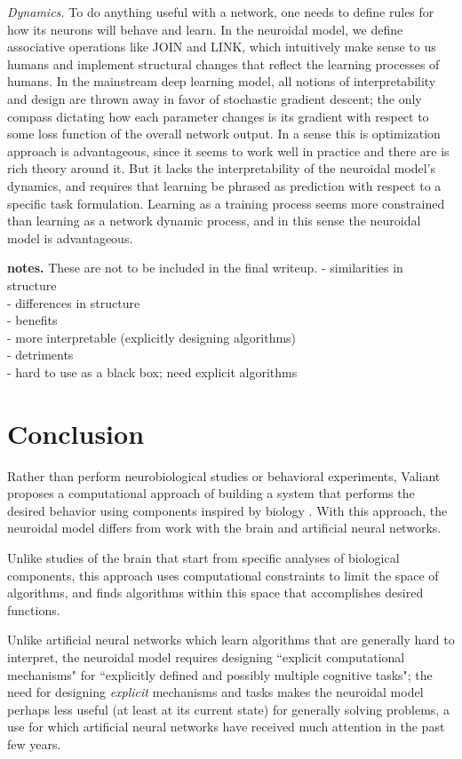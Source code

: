 \documentclass[letterpaper, 12pt]{article}
\begin{document}
{\it Dynamics.} To do anything useful with a network, one needs to define rules for how its neurons will behave and learn. In the neuroidal model, we define associative operations like JOIN and LINK, which intuitively make sense to us humans and implement structural changes that reflect the learning processes of humans. In the mainstream deep learning model, all notions of interpretability and design are thrown away in favor of stochastic gradient descent; the only compass dictating how each parameter changes is its gradient with respect to some loss function of the overall network output. In a sense this is optimization approach is advantageous, since it seems to work well in practice and there are is rich theory around it. But it lacks the interpretability of the neuroidal model's dynamics, and requires that learning be phrased as prediction with respect to a specific task formulation. Learning as a training process seems more constrained than learning as a network dynamic process, and in this sense the neuroidal model is advantageous. 

{\bf notes.} These are not to be included in the final writeup.
- similarities in structure\\
- differences in structure\\
- benefits\\
- more interpretable (explicitly designing algorithms)\\
- detriments\\
- hard to use as a black box; need explicit algorithms\\

\section{Conclusion}
Rather than perform neurobiological studies or behavioral experiments, Valiant proposes a computational approach of building a system that performs the desired behavior using components inspired by biology \cite{valiant_circuits_1994}. With this approach, the neuroidal model differs from work with the brain and artificial neural networks.

Unlike studies of the brain that start from specific analyses of biological components, this approach uses computational constraints to limit the space of algorithms, and finds algorithms within this space that accomplishes desired functions.

Unlike artificial neural networks which learn algorithms that are generally hard to interpret, the neuroidal model requires designing ``explicit computational mechanisms" for ``explicitly defined and possibly multiple cognitive tasks"; the need for designing \textit{explicit} mechanisms and tasks makes the neuroidal model perhaps less useful (at least at its current state) for generally solving problems, a use for which artificial neural networks have received much attention in the past few years.
\end{document}
